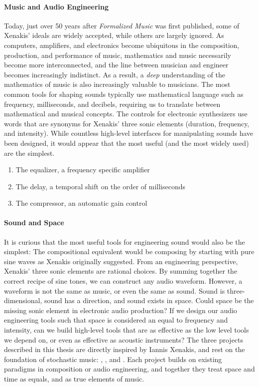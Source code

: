 \paragraph{Music and Audio Engineering}
Today, just over 50 years after \textit{Formalized Music} was first
published, some of Xenakis' ideals are widely accepted, while others
are largely ignored. As computers, amplifiers, and electronics become
ubiquitous in the composition, production, and performance of music,
mathematics and music necessarily become more interconnected, and the
line between musician and engineer becomes increasingly indistinct.
As a result, a \textit{deep} understanding of the mathematics of music
is also increasingly valuable to musicians.  The most common tools for
shaping sounds typically use mathematical language such as frequency,
milliseconds, and decibels, requiring us to translate between
mathematical and musical concepts. The controls for electronic
synthesizers use words that are synonyms for Xenakis' three sonic
elements (duration, frequency, and intensity). While countless
high-level interfaces for manipulating sounds have been designed, it
would appear that the most useful (and the most widely used) are the
simplest.
\begin{enumerate}
\item The equalizer, a frequency specific amplifier
\item The delay, a temporal shift on the order of milliseconds
\item The compressor, an automatic gain control
\end{enumerate}

\paragraph{Sound and Space}
It is curious that the most useful tools for engineering sound would
also be the simplest: The compositional equivalent would be composing
by starting with pure sine waves as Xenakis originally suggested.
From an engineering perspective, Xenakis' three sonic elements are
rational choices. By summing together the correct recipe of sine
tones, we can construct any audio waveform. However, a waveform is not
the same as music, or even the same as sound. Sound is
three-dimensional, sound has a direction, and sound exists in
space. Could space be the missing sonic element in electronic audio
production? If we design our audio engineering tools such that space
is considered an equal to frequency and intensity, can we build
high-level tools that are as effective as the low level tools we depend
on, or even as effective as acoustic instruments? The three projects
described in this thesis are directly inspired by Iannis Xenakis, and rest on
the foundation of stochastic music: , \polytempic, and
\thesis. Each project builds on existing paradigms in composition or
audio engineering, and together they treat space and time as equals,
and as true elements of music.

